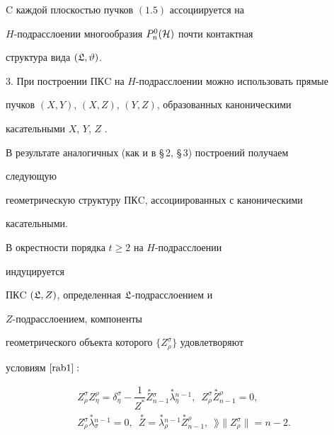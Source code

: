 \begin{thm}


C каждой плоскостью пучков $(1.5)$ ассоциируется на


$H$-подрасслоении многообразия $P^0_n(\cal H)$ почти контактная


структура вида $(\frak L, \vartheta)$.


\end{thm}





3. При построении ПКC на $H$-подрасслоении можно использовать прямые


пучков $(X,Y)$, $(X,Z)$, $(Y,Z)$, образованных каноническими


касательными $X$, $Y$, $Z$ \cite{rab7}.


В результате аналогичных (как и в \S\,2, \S\,3) построений получаем


следующую


геометрическую структуру ПКC, ассоциированных с каноническими


касательными.





\begin{thm}


В окрестности порядка $t\ge 2$ на $H$-подрасслоении


индуцируется


ПКC $(\frak L, Z)$, определенная $\frak L$-подрасслоением и


$Z$-подрасслоением, компоненты


геометрического объекта которого $\{ Z^\sigma_\rho\}$ удовлетворяют


условиям $\cite{rab1}:$


\begin{equation}


\begin{array}{c}


Z^\sigma_\rho Z^\rho_\eta = \delta^\sigma_\eta -


\dfrac1{Z^*} \overset{*}{Z}{}^\sigma_{n-1}


\overset{*}{\lambda}{}^{n-1}_{\eta},\ \;


Z^\sigma_\rho \overset{*}{Z}{}^\rho_{n-1}=0, \\[2mm]


Z^\sigma_\rho \overset{*}{\lambda}{}^{n-1}_\sigma = 0,\ \;


\overset{*}{Z}=\overset{*}{\lambda}{}^{n-1}_\rho


\overset{*}{Z}{}^\rho_{n-1},\ \;


\rang\| Z^\sigma_\rho \| = n-2.


\end{array}


\end{equation}


\end{thm}





